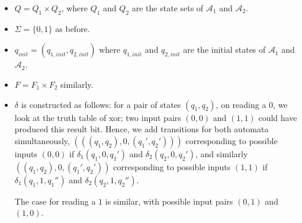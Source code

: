 \begin{exercise}{}
\begin{solution}
\begin{enumerate}
      \begin{itemize}
        \item \(Q = Q_1 \times Q_2\), where \(Q_1\) and \(Q_2\) are the state
        sets of \(\mathcal{A}_1\) and \(\mathcal{A}_2\).
        \item \(\Sigma = \{0, 1\}\) as before.
        \item \(q_{init} = (q_{1, init}, q_{2, init})\) where \(q_{1, init}\)
        and \(q_{2, init}\) are the initial states of \(\mathcal{A}_1\) and
        \(\mathcal{A}_2\).
        \item \(F = F_1 \times F_2\) similarly.
        \item \(\delta\) is constructed as follows: for a pair of states \((q_1,
        q_2)\), on reading a \(0\), we look at the truth table of xor; two input
        pairs \((0, 0)\) and \((1, 1)\) could have produced this result bit.
        Hence, we add transitions for both automata simultaneously, \((((q_1,
        q_2), 0, (q_1', q_2')))\) corresponding to possible inputs \((0, 0)\) if
        \(\delta_1(q_1, 0, q_1')\) and \(\delta_2(q_2, 0, q_2')\), and similarly
        \(((q_1, q_2), 0, (q_1', q_2'))\) corresponding to possible inputs \((1,
        1)\) if \(\delta_1(q_1, 1, q_1'')\) and \(\delta_2(q_2, 1, q_2'')\). 
        
        The case for reading a \(1\) is similar, with possible input pairs \((0,
        1)\) and \((1, 0)\).
      \end{itemize}

    \end{enumerate}
  \end{solution}

\end{exercise}


